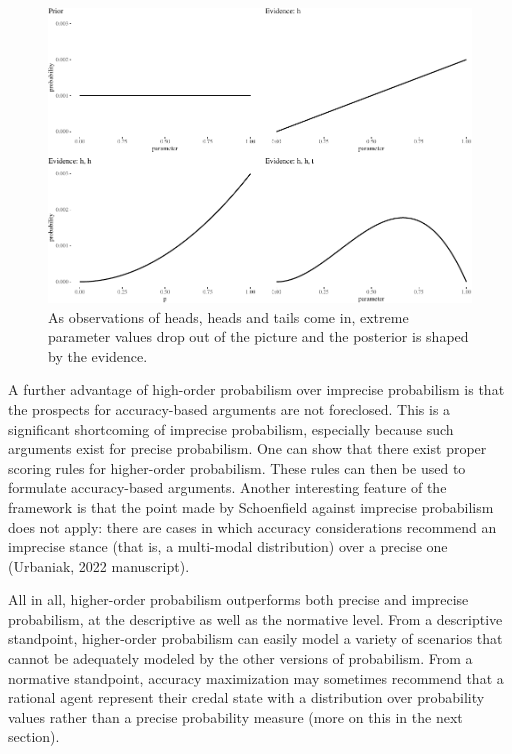 \documentclass[
  10pt,
  dvipsnames,enabledeprecatedfontcommands]{scrartcl}
\begin{document}
\begin{figure}[t]

\begin{center}\includegraphics[width=0.8\linewidth]{chapter-outline_files/figure-latex/fig:inertia3-1} \end{center}
\caption{As observations of heads, heads and tails come in, extreme parameter values drop out of the picture and the posterior is shaped by the evidence.}
\label{fig:intertia2}
\end{figure}

A further advantage of high-order probabilism over imprecise probabilism
is that the prospects for accuracy-based arguments are not foreclosed.
This is a significant shortcoming of imprecise probabilism, especially
because such arguments exist for precise probabilism. One can show that
there exist proper scoring rules for higher-order probabilism. These
rules can then be used to formulate accuracy-based arguments. Another
interesting feature of the framework is that the point made by
Schoenfield against imprecise probabilism does not apply: there are
cases in which accuracy considerations recommend an imprecise stance
(that is, a multi-modal distribution) over a precise one (Urbaniak, 2022
manuscript).

All in all, higher-order probabilism outperforms both precise and
imprecise probabilism, at the descriptive as well as the normative
level. From a descriptive standpoint, higher-order probabilism can
easily model a variety of scenarios that cannot be adequately modeled by
the other versions of probabilism. From a normative standpoint, accuracy
maximization may sometimes recommend that a rational agent represent
their credal state with a distribution over probability values rather
than a precise probability measure (more on this in the next section).
\end{document}
